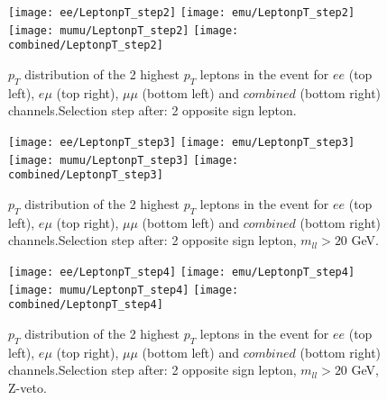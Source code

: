 


\begin{figure}
  \texttt{[image: ee/LeptonpT\_step2]}
  \texttt{[image: emu/LeptonpT\_step2]}\\
  \texttt{[image: mumu/LeptonpT\_step2]}
  \texttt{[image: combined/LeptonpT\_step2]}
\caption{$p_T$ distribution of the 2 highest $p_T$ leptons in the event for $ee$ (top left), $e\mu$ (top right), $\mu\mu$ (bottom left) and $combined$ (bottom right) channels.\newline Selection step after: 2 opposite sign lepton.}
\end{figure}

\clearpage
\newpage

\begin{figure}
  \texttt{[image: ee/LeptonpT\_step3]}
  \texttt{[image: emu/LeptonpT\_step3]}\\
  \texttt{[image: mumu/LeptonpT\_step3]}
  \texttt{[image: combined/LeptonpT\_step3]}
\caption{$p_T$ distribution of the 2 highest $p_T$ leptons in the event for $ee$ (top left), $e\mu$ (top right), $\mu\mu$ (bottom left) and $combined$ (bottom right) channels.\newline Selection step after: 2 opposite sign lepton, $m_{ll}>20$ GeV.}
\end{figure}

\clearpage
\newpage


\begin{figure}
  \texttt{[image: ee/LeptonpT\_step4]}
  \texttt{[image: emu/LeptonpT\_step4]}\\
  \texttt{[image: mumu/LeptonpT\_step4]}
  \texttt{[image: combined/LeptonpT\_step4]}
\caption{$p_T$ distribution of the 2 highest $p_T$ leptons in the event for $ee$ (top left), $e\mu$ (top right), $\mu\mu$ (bottom left) and $combined$ (bottom right) channels.\newline Selection step after: 2 opposite sign lepton, $m_{ll}>20$ GeV, Z-veto.}
\end{figure}

